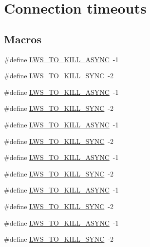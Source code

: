 \hypertarget{group__timeout}{}\section{Connection timeouts}
\label{group__timeout}
\subsection*{Macros}
\begin{DoxyCompactItemize}
\item 
\#define \hyperlink{group__timeout_ga6a53a9a771c08417ffe75c953b58f015}{L\+W\+S\+\_\+\+T\+O\+\_\+\+K\+I\+L\+L\+\_\+\+A\+S\+Y\+NC}~-\/1
\item 
\#define \hyperlink{group__timeout_ga3cef438d5bbd20a33afbec8e29a0b9a6}{L\+W\+S\+\_\+\+T\+O\+\_\+\+K\+I\+L\+L\+\_\+\+S\+Y\+NC}~-\/2
\item 
\#define \hyperlink{group__timeout_ga6a53a9a771c08417ffe75c953b58f015}{L\+W\+S\+\_\+\+T\+O\+\_\+\+K\+I\+L\+L\+\_\+\+A\+S\+Y\+NC}~-\/1
\item 
\#define \hyperlink{group__timeout_ga3cef438d5bbd20a33afbec8e29a0b9a6}{L\+W\+S\+\_\+\+T\+O\+\_\+\+K\+I\+L\+L\+\_\+\+S\+Y\+NC}~-\/2
\item 
\#define \hyperlink{group__timeout_ga6a53a9a771c08417ffe75c953b58f015}{L\+W\+S\+\_\+\+T\+O\+\_\+\+K\+I\+L\+L\+\_\+\+A\+S\+Y\+NC}~-\/1
\item 
\#define \hyperlink{group__timeout_ga3cef438d5bbd20a33afbec8e29a0b9a6}{L\+W\+S\+\_\+\+T\+O\+\_\+\+K\+I\+L\+L\+\_\+\+S\+Y\+NC}~-\/2
\item 
\#define \hyperlink{group__timeout_ga6a53a9a771c08417ffe75c953b58f015}{L\+W\+S\+\_\+\+T\+O\+\_\+\+K\+I\+L\+L\+\_\+\+A\+S\+Y\+NC}~-\/1
\item 
\#define \hyperlink{group__timeout_ga3cef438d5bbd20a33afbec8e29a0b9a6}{L\+W\+S\+\_\+\+T\+O\+\_\+\+K\+I\+L\+L\+\_\+\+S\+Y\+NC}~-\/2
\item 
\#define \hyperlink{group__timeout_ga6a53a9a771c08417ffe75c953b58f015}{L\+W\+S\+\_\+\+T\+O\+\_\+\+K\+I\+L\+L\+\_\+\+A\+S\+Y\+NC}~-\/1
\item 
\#define \hyperlink{group__timeout_ga3cef438d5bbd20a33afbec8e29a0b9a6}{L\+W\+S\+\_\+\+T\+O\+\_\+\+K\+I\+L\+L\+\_\+\+S\+Y\+NC}~-\/2
\item 
\#define \hyperlink{group__timeout_ga6a53a9a771c08417ffe75c953b58f015}{L\+W\+S\+\_\+\+T\+O\+\_\+\+K\+I\+L\+L\+\_\+\+A\+S\+Y\+NC}~-\/1
\item 
\#define \hyperlink{group__timeout_ga3cef438d5bbd20a33afbec8e29a0b9a6}{L\+W\+S\+\_\+\+T\+O\+\_\+\+K\+I\+L\+L\+\_\+\+S\+Y\+NC}~-\/2
\end{DoxyCompactItemize}
